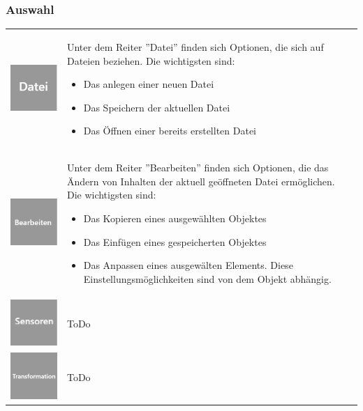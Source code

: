 \documentclass[parskip=full]{scrartcl}
\begin{document}
\subsubsection{Auswahl}

\begin{tabular}[t]{p{1cm} p{10cm}}
	\vspace{0cm}\includegraphics[width = 1 cm]{Grafik/Datei.png} & Unter dem Reiter ''Datei'' finden sich Optionen, die sich auf Dateien beziehen. Die wichtigsten sind: 
	\begin{itemize} 
		\item Das anlegen einer neuen Datei
		\item Das Speichern der aktuellen Datei
		\item Das Öffnen einer bereits erstellten Datei
	\end{itemize}\\
	\vspace{0cm}\includegraphics[width = 1 cm]{Grafik/Bearbeiten.png} & Unter dem Reiter ''Bearbeiten'' finden sich Optionen, die das Ändern von Inhalten der aktuell geöffneten Datei ermöglichen. Die wichtigsten sind:
	\begin{itemize} 
		\item Das Kopieren eines ausgewählten Objektes
		\item Das Einfügen eines gespeicherten Objektes
		\item Das Anpassen eines ausgewälten Elements. Diese Einstellungsmöglichkeiten sind von dem Objekt abhängig.
	\end{itemize}\\
	\vspace{0cm}\includegraphics[width = 1 cm]{Grafik/Sensor.png} & ToDo\\
	\vspace{0cm}\includegraphics[width = 1 cm]{Grafik/Verbindung.png} & ToDo\\

\end{tabular}
\end{document}
